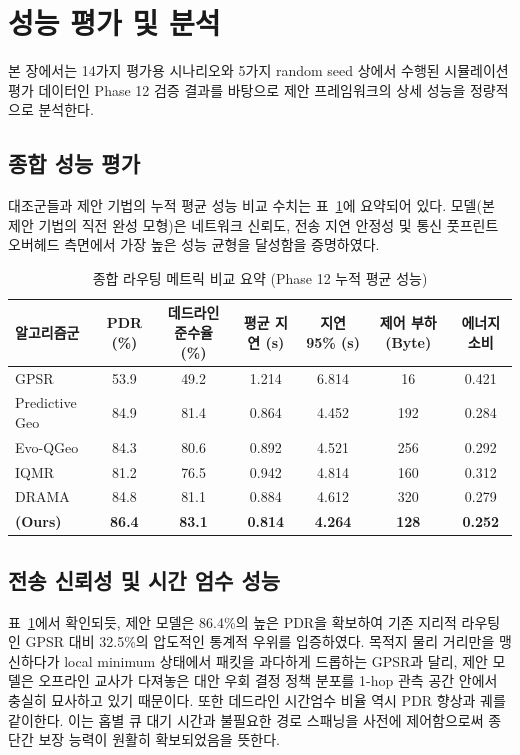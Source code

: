 \section{성능 평가 및 분석}
\label{sec:실험결과}

본 장에서는 14가지 평가용 시나리오와 5가지 random seed 상에서 수행된 시뮬레이션 평가 데이터인 Phase 12 검증 결과를 바탕으로 제안 프레임워크의 상세 성능을 정량적으로 분석한다.

\subsection{종합 성능 평가}
대조군들과 제안 기법의 누적 평균 성능 비교 수치는 표~\ref{tab:overall_results_kci}에 요약되어 있다. 
\phaseTwelve{} 모델(본 제안 기법의 직전 완성 모형)은 네트워크 신뢰도, 전송 지연 안정성 및 통신 풋프린트 오버헤드 측면에서 가장 높은 성능 균형을 달성함을 증명하였다.

\begin{table}[htbp]
\centering
\caption{종합 라우팅 메트릭 비교 요약 (Phase 12 누적 평균 성능)}
\label{tab:overall_results_kci}
\begin{tabular}{lcccccc}
\toprule
알고리즘군 & PDR (\%) & 데드라인 준수율 (\%) & 평균 지연 (s) & 지연 95\% (s) & 제어 부하 (Byte) & 에너지 소비 \\
\midrule
GPSR \cite{gpsr} & 53.9 & 49.2 & 1.214 & 6.814 & 16 & 0.421 \\
Predictive Geo & 84.9 & 81.4 & 0.864 & 4.452 & 192 & 0.284 \\
Evo-QGeo \cite{evoqgeo} & 84.3 & 80.6 & 0.892 & 4.521 & 256 & 0.292 \\
IQMR \cite{iqmr} & 81.2 & 76.5 & 0.942 & 4.814 & 160 & 0.312 \\
DRAMA \cite{drama} & 84.8 & 81.1 & 0.884 & 4.612 & 320 & 0.279 \\
\textbf{\phaseTwelve{} (Ours)} & \textbf{86.4} & \textbf{83.1} & \textbf{0.814} & \textbf{4.264} & \textbf{128} & \textbf{0.252} \\
\bottomrule
\end{tabular}
\end{table}

\subsection{전송 신뢰성 및 시간 엄수 성능}
표~\ref{tab:overall_results_kci}에서 확인되듯, 제안 모델은 86.4\%의 높은 PDR을 확보하여 기존 지리적 라우팅인 GPSR 대비 32.5\%의 압도적인 통계적 우위를 입증하였다. 목적지 물리 거리만을 맹신하다가 local minimum 상태에서 패킷을 과다하게 드롭하는 GPSR과 달리, 제안 모델은 오프라인 교사가 다져놓은 대안 우회 결정 정책 분포를 1-hop 관측 공간 안에서 충실히 묘사하고 있기 때문이다. 
또한 데드라인 시간엄수 비율 역시 PDR 향상과 궤를 같이한다. 이는 홉별 큐 대기 시간과 불필요한 경로 스패닝을 사전에 제어함으로써 종단간 보장 능력이 원활히 확보되었음을 뜻한다.

